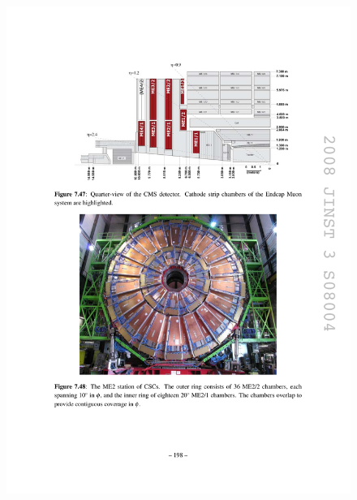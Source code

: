 \begin{figure}[hbtp]
  \begin{center}
    \includegraphics[width=1.24\cmsFigWidth]{figures/cms-muon-CSClayout}

\end{center}
\end{figure}
